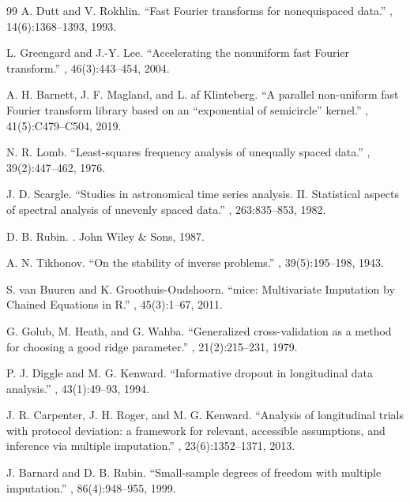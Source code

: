 \documentclass[11pt,a4paper]{article}
\begin{document}
\begin{thebibliography}{99}
A. Dutt and V. Rokhlin.
\newblock ``Fast Fourier transforms for nonequispaced data.''
, 14(6):1368--1393, 1993.

L. Greengard and J.-Y. Lee.
\newblock ``Accelerating the nonuniform fast Fourier transform.''
, 46(3):443--454, 2004.

A. H. Barnett, J. F. Magland, and L. af Klinteberg.
\newblock ``A parallel non-uniform fast Fourier transform library based on an ``exponential of semicircle'' kernel.''
, 41(5):C479--C504, 2019.

N. R. Lomb.
\newblock ``Least-squares frequency analysis of unequally spaced data.''
, 39(2):447--462, 1976.

J. D. Scargle.
\newblock ``Studies in astronomical time series analysis. II. Statistical aspects of spectral analysis of unevenly spaced data.''
, 263:835--853, 1982.

D. B. Rubin.
.
\newblock John Wiley \& Sons, 1987.

A. N. Tikhonov.
\newblock ``On the stability of inverse problems.''
, 39(5):195--198, 1943.

S. van Buuren and K. Groothuis-Oudshoorn.
\newblock ``mice: Multivariate Imputation by Chained Equations in R.''
, 45(3):1--67, 2011.

G. Golub, M. Heath, and G. Wahba.
\newblock ``Generalized cross-validation as a method for choosing a good ridge parameter.''
, 21(2):215--231, 1979.

P. J. Diggle and M. G. Kenward.
\newblock ``Informative dropout in longitudinal data analysis.''
, 43(1):49--93, 1994.

J. R. Carpenter, J. H. Roger, and M. G. Kenward.
\newblock ``Analysis of longitudinal trials with protocol deviation: a framework for relevant, accessible assumptions, and inference via multiple imputation.''
, 23(6):1352--1371, 2013.

J. Barnard and D. B. Rubin.
\newblock ``Small-sample degrees of freedom with multiple imputation.''
, 86(4):948--955, 1999.
\end{thebibliography}
\end{document}
